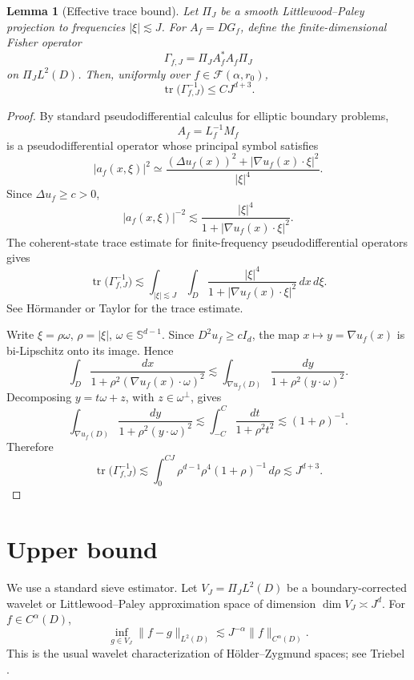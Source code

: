 \documentclass[11pt]{article}
\newtheorem{lemma}{Lemma}
\newcommand{\cF}{\mathcal F}
\begin{document}
\begin{lemma}[Effective trace bound]
\label{lem:trace}
Let \(\Pi_J\) be a smooth Littlewood--Paley projection to frequencies \(|\xi|\lesssim J\). For \(A_f=DG_f\), define the finite-dimensional Fisher operator
\[
 \Gamma_{f,J}=\Pi_J A_f^*A_f\Pi_J
\]
on \(\Pi_JL^2(D)\). Then, uniformly over \(f\in\cF(\alpha,r_0)\),
\[
 \operatorname{tr}\bigl(\Gamma_{f,J}^{-1}\bigr)
 \le C J^{d+3}.
\]
\end{lemma}

\begin{proof}
By standard pseudodifferential calculus for elliptic boundary problems,
\[
 A_f=L_f^{-1}M_f
\]
is a pseudodifferential operator whose principal symbol satisfies
\[
 |a_f(x,\xi)|^2
 \simeq
 \frac{(\Delta u_f(x))^2+|\nabla u_f(x)\cdot\xi|^2}{|\xi|^4}.
\]
Since \(\Delta u_f\ge c>0\),
\[
 |a_f(x,\xi)|^{-2}
 \lesssim
 \frac{|\xi|^4}{1+|\nabla u_f(x)\cdot\xi|^2}.
\]
The coherent-state trace estimate for finite-frequency pseudodifferential operators gives
\[
 \operatorname{tr}\bigl(\Gamma_{f,J}^{-1}\bigr)
 \lesssim
 \int_{|\xi|\lesssim J}\int_D
 \frac{|\xi|^4}{1+|\nabla u_f(x)\cdot\xi|^2}\,dx\,d\xi.
\]
See H\"ormander \cite[Vol. III, Ch. 18]{Hormander} or Taylor \cite[Ch. 7]{Taylor} for the trace estimate.

Write \(\xi=\rho\omega\), \(\rho=|\xi|\), \(\omega\in\mathbb S^{d-1}\). Since \(D^2u_f\ge cI_d\), the map \(x\mapsto y=\nabla u_f(x)\) is bi-Lipschitz onto its image. Hence
\[
 \int_D\frac{dx}{1+\rho^2(\nabla u_f(x)\cdot\omega)^2}
 \lesssim
 \int_{\nabla u_f(D)}
 \frac{dy}{1+\rho^2(y\cdot\omega)^2}.
\]
Decomposing \(y=t\omega+z\), with \(z\in\omega^\perp\), gives
\[
 \int_{\nabla u_f(D)}
 \frac{dy}{1+\rho^2(y\cdot\omega)^2}
 \lesssim
 \int_{-C}^{C}\frac{dt}{1+\rho^2t^2}
 \lesssim
 (1+\rho)^{-1}.
\]
Therefore
\[
 \operatorname{tr}\bigl(\Gamma_{f,J}^{-1}\bigr)
 \lesssim
 \int_0^{CJ} \rho^{d-1}\rho^4(1+\rho)^{-1}\,d\rho
 \lesssim J^{d+3}.
\]
\end{proof}

\section{Upper bound}

We use a standard sieve estimator. Let \(V_J=\Pi_JL^2(D)\) be a boundary-corrected wavelet or Littlewood--Paley approximation space of dimension \(\dim V_J\asymp J^d\). For \(f\in C^\alpha(D)\),
\[
 \inf_{g\in V_J}\|f-g\|_{L^2(D)}\lesssim J^{-\alpha}\|f\|_{C^\alpha(D)}.
\]
This is the usual wavelet characterization of Hölder--Zygmund spaces; see Triebel \cite{Triebel}.
\end{document}
